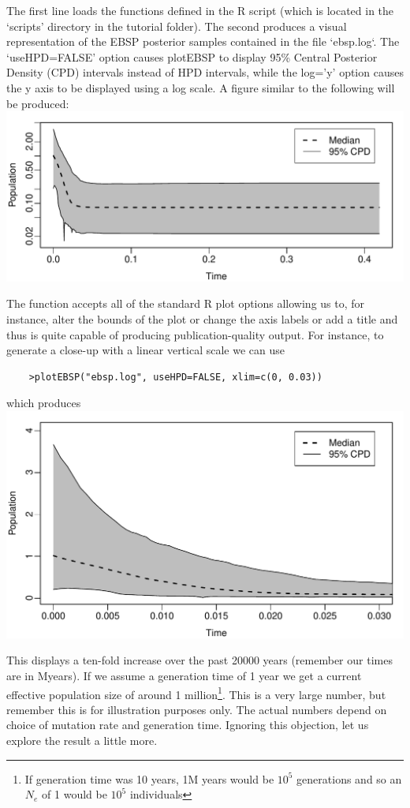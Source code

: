 \documentclass[a4paper,11pt]{article}
\begin{document}
The first line loads the functions defined in the R script (which is located in
the `scripts' directory in the tutorial folder). The second produces a visual
representation of the EBSP posterior samples contained in the file `ebsp.log`.
The `useHPD=FALSE' option causes plotEBSP to display 95\% Central Posterior
Density (CPD) intervals instead of HPD intervals, while the log='y' option
causes the y axis to be displayed using a log scale.  A figure similar to the
following will be produced:\\
\includegraphics[width=\textwidth]{figures/mystery1.pdf}

The function accepts all of the standard R plot options allowing us to, for
instance, alter the bounds of the plot or change the axis labels or add a title
and thus is quite capable of producing publication-quality output.  For
instance, to generate a close-up with a linear vertical scale we can use
\begin{verbatim}
    >plotEBSP("ebsp.log", useHPD=FALSE, xlim=c(0, 0.03))
\end{verbatim}
which produces\\
\includegraphics[width=\textwidth]{figures/mystery2.pdf}

This displays a ten-fold increase over the past 20000 years (remember our times
are in Myears). If we assume a generation time of 1 year we get a current
effective population size of around 1 million\footnote{If generation time was
    10 years, 1M years would be $10^5$ generations and so an $N_e$ of 1 would
    be $10^5$ individuals}. This is a very large number, but remember this is
for illustration purposes only. The actual numbers depend on choice of mutation
rate and generation time. Ignoring this objection, let us explore the result a
little more.
\end{document}
